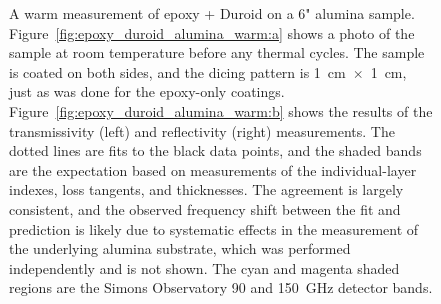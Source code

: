 \begin{figure}[!t]
    \centering
    \hfill
    \caption[A warm measurement of epoxy + Duroid on a 6" alumina sample.]{A warm measurement of epoxy + Duroid on a 6" alumina sample. Figure~\ref{fig:epoxy_duroid_alumina_warm:a} shows a photo of the sample at room temperature before any thermal cycles. The sample is coated on both sides, and the dicing pattern is 1~cm~$\times$~1~cm, just as was done for the epoxy-only coatings. Figure~\ref{fig:epoxy_duroid_alumina_warm:b} shows the results of the transmissivity (left) and reflectivity (right) measurements. The dotted lines are fits to the black data points, and the shaded bands are the expectation based on measurements of the individual-layer indexes, loss tangents, and thicknesses. The agreement is largely consistent, and the observed frequency shift between the fit and prediction is likely due to systematic effects in the measurement of the underlying alumina substrate, which was performed independently and is not shown. The cyan and magenta shaded regions are the Simons Observatory 90 and 150~GHz detector bands.}
    \label{fig:epoxy_duroid_alumina_warm}
\end{figure}

